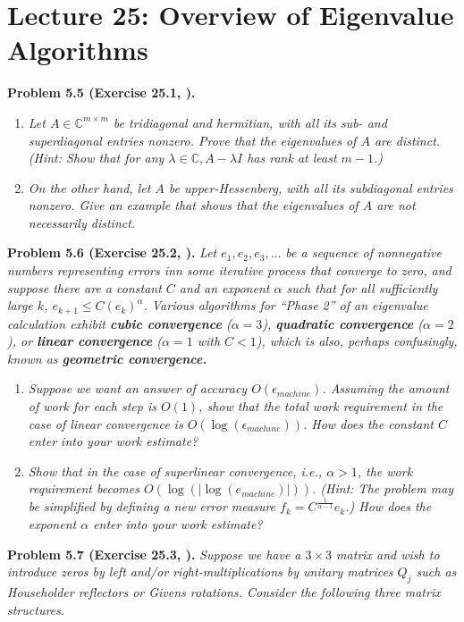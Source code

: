 \documentclass[a4paper,oneside]{book}
\numberwithin{equation}{chapter}
\begin{document}
\section{Lecture 25: Overview of Eigenvalue Algorithms}
\textbf{Problem 5.5 (Exercise 25.1, \cite{1}).}
\begin{enumerate}
\item \textit{Let $A\in \mathbb{C}^{m\times m}$ be tridiagonal and hermitian, with all its sub- and superdiagonal entries nonzero. Prove that the eigenvalues of $A$ are distinct. (Hint: Show that for any $\lambda \in \mathbb{C},A-\lambda I$ has rank at least $m-1$.)}
\item \textit{On the other hand, let $A$ be upper-Hessenberg, with all its subdiagonal entries nonzero. Give an example that shows that the eigenvalues of $A$ are not necessarily distinct.}
\end{enumerate}
\textbf{Problem 5.6 (Exercise 25.2, \cite{1}).} \textit{Let $e_1,e_2,e_3,\ldots$ be a sequence of nonnegative numbers representing errors inn some iterative process that converge to zero, and suppose there are a constant $C$ and an exponent $\alpha$ such that for all sufficiently large $k$, $e_{k+1}\le C\left(e_k\right)^\alpha$. Various algorithms for ``Phase 2'' of an eigenvalue calculation exhibit \textbf{cubic convergence} ($\alpha =3$), \textbf{quadratic convergence} ($\alpha =2$), or \textbf{linear convergence} ($\alpha =1$ with $C<1$), which is also, perhaps confusingly, known as \textbf{geometric convergence.}}
\begin{enumerate}
\item \textit{Suppose we want an answer of accuracy $O\left(\epsilon _{machine}\right)$. Assuming the amount of work for each step is $O\left(1\right)$, show that the total work requirement in the case of linear convergence is $O\left( {\log \left( {{\epsilon _{machine}}} \right)} \right)$. How does the constant $C$ enter into your work estimate?}
\item \textit{Show that in the case of superlinear convergence, i.e., $\alpha >1$, the work requirement becomes $O\left( {\log \left( {\left| {\log \left( {{e_{machine}}} \right)} \right|} \right)} \right)$. (Hint: The problem may be simplified by defining a new error measure ${f_k} = {C^{\frac{1}{{\alpha  - 1}}}}{e_k}$.) How does the exponent $\alpha$ enter into your work estimate?}
\end{enumerate} 
\textbf{Problem 5.7 (Exercise 25.3, \cite{1}).} \textit{Suppose we have a $3\times 3$ matrix and wish to introduce zeros by left and/or right-multiplications by unitary matrices $Q_j$ such as Householder reflectors or Givens rotations. Consider the following three matrix structures.}
\end{document}
